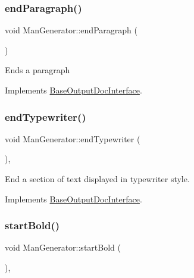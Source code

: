 \subsubsection{\texorpdfstring{endParagraph()}{endParagraph()}}
{\footnotesize\ttfamily void Man\+Generator\+::end\+Paragraph (\begin{DoxyParamCaption}{ }\end{DoxyParamCaption})\hspace{0.3cm}{\ttfamily [virtual]}}

Ends a paragraph 

Implements \mbox{\hyperlink{class_base_output_doc_interface_ab76280c2eb451ad160991707206b6c95}{Base\+Output\+Doc\+Interface}}.

\mbox{\label{class_man_generator_a918922201985cac387c671a9767021d1}} 
\subsubsection{\texorpdfstring{endTypewriter()}{endTypewriter()}}
{\footnotesize\ttfamily void Man\+Generator\+::end\+Typewriter (\begin{DoxyParamCaption}{ }\end{DoxyParamCaption})\hspace{0.3cm}{\ttfamily [inline]}, {\ttfamily [virtual]}}

End a section of text displayed in typewriter style. 

Implements \mbox{\hyperlink{class_base_output_doc_interface_a9e987baf8aed76f0e5e6676b3238d2c8}{Base\+Output\+Doc\+Interface}}.

\mbox{\label{class_man_generator_a93a20331a8e073df653ed1df9834361b}} 
\subsubsection{\texorpdfstring{startBold()}{startBold()}}
{\footnotesize\ttfamily void Man\+Generator\+::start\+Bold (\begin{DoxyParamCaption}{ }\end{DoxyParamCaption})\hspace{0.3cm}{\ttfamily [inline]}, {\ttfamily [virtual]}}


